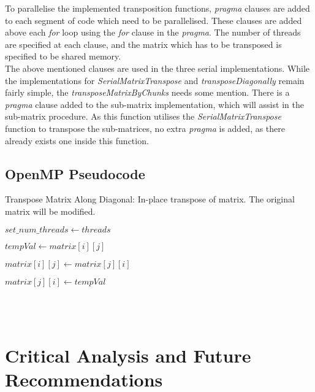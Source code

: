 \documentclass[a4paper, 11pt, onecolumn, conference]{IEEEtran}      %
\begin{document}
To parallelise the implemented transposition functions, \textit{pragma} clauses are added to each segment of code which need to be parallelised. These clauses are added above each \textit{for} loop using the \textit{for} clause in the \textit{pragma}. The number of threads are specified at each clause, and the matrix which has to be transposed is specified to be shared memory.\\

The above mentioned clauses are used in the three serial implementations. While the implementations for \textit{SerialMatrixTranspose} and \textit{transposeDiagonally} remain fairly simple, the \textit{transposeMatrixByChunks} needs some mention. There is a \textit{pragma} clause added to the sub-matrix implementation, which will assist in the sub-matrix procedure. As this function utilises the \textit{SerialMatrixTranspose} function to transpose the sub-matrices, no extra \textit{pragma} is added, as there already exists one inside this function.

\subsection{OpenMP Pseudocode}

Transpose Matrix Along Diagonal: In-place transpose of matrix. The original matrix will be modified.

\begin{algorithmic}


$set\_num\_threads \gets threads$

      
      $tempVal \gets matrix[i][j]$
      
      $matrix[i][j] \gets matrix[j][i]$
      
      $matrix[j][i] \gets tempVal$
    \EndFor
\EndFor

\EndFunction \\ \\

\end{algorithmic}


\section{Critical Analysis and Future Recommendations}
\end{document}
